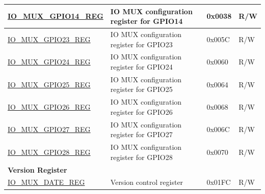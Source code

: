 \begin{longtable}{ | p{6cm} | p{7.2cm} | p{1.3cm} | p{1cm} | }
\hyperref[regdesc:IOMUXGPIONREG]{IO\_MUX\_GPIO14\_REG} & IO MUX configuration register for GPIO14 & 0x0038 & R/W \\ \hline
\hyperref[regdesc:IOMUXGPIONREG]{IO\_MUX\_GPIO23\_REG} & IO MUX configuration register for GPIO23 & 0x005C & R/W \\ \hline
\hyperref[regdesc:IOMUXGPIONREG]{IO\_MUX\_GPIO24\_REG} & IO MUX configuration register for GPIO24 & 0x0060 & R/W \\ \hline
\hyperref[regdesc:IOMUXGPIONREG]{IO\_MUX\_GPIO25\_REG} & IO MUX configuration register for GPIO25 & 0x0064 & R/W \\ \hline
\hyperref[regdesc:IOMUXGPIONREG]{IO\_MUX\_GPIO26\_REG} & IO MUX configuration register for GPIO26 & 0x0068 & R/W \\ \hline
\hyperref[regdesc:IOMUXGPIONREG]{IO\_MUX\_GPIO27\_REG} & IO MUX configuration register for GPIO27 & 0x006C & R/W \\ \hline
\hyperref[regdesc:IOMUXGPIONREG]{IO\_MUX\_GPIO28\_REG} & IO MUX configuration register for GPIO28 & 0x0070 & R/W \\ \hline
\multicolumn{4}{|l|}{\textbf{Version Register}} \\ \hline
\hyperref[regdesc:IOMUXDATEREG]{IO\_MUX\_DATE\_REG} & Version control register & 0x01FC & R/W \\ \hline
\end{longtable}

